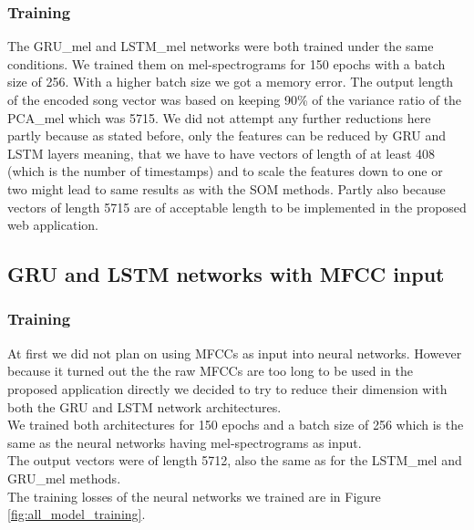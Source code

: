 \subsubsection{Training}
The GRU\_mel and LSTM\_mel networks were both trained under the same conditions. We trained them on mel-spectrograms for 150 epochs with a batch size of 256. With a higher batch size we got a memory error. The output length of the encoded song vector was based on keeping 90\% of the variance ratio of the PCA\_mel which was 5715. We did not attempt any further reductions here partly because as stated before, only the features can be reduced by GRU and LSTM layers meaning, that we have to have vectors of length of at least 408 (which is the number of timestamps) and to scale the features down to one or two might lead to same results as with the SOM methods. Partly also because vectors of length 5715 are of acceptable length to be implemented in the proposed web application.

\subsection{GRU and LSTM networks with MFCC input}\label{ssec:GRU_LSTM_MFCC_experiments}

\subsubsection{Training}
At first we did not plan on using MFCCs as input into neural networks. However because it turned out the the raw MFCCs are too long to be used in the proposed application directly we decided to try to reduce their dimension with both the GRU and LSTM network architectures. \\ 
We trained both architectures for 150 epochs and a batch size of 256 which is the same as the neural networks having mel-spectrograms as input. \\
The output vectors were of length 5712, also the same as for the LSTM\_mel and GRU\_mel methods.\\

The training losses of the neural networks we trained are in Figure \ref{fig:all_model_training}.

